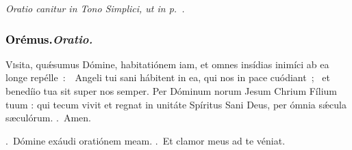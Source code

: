\documentclass[12pt]{article} %
\newenvironment{rubric}{\color{benred8} \itshape \leftskip 0in \setlength{\parindent}{0.25in}}{\vspace{2 mm}}
\newenvironment{response}{\leftskip 0in \setlength{\parindent}{0in}}{\vspace{2 mm}}
\let\oldgresixstar\gresixstar
\renewcommand{\gresixstar}{\textcolor{benred8}{\oldgresixstar}}
\let\oldgredagger\gredagger
\renewcommand{\gredagger}{\textcolor{benred8}{\oldgredagger}}
\let\oldVbar\Vbar
\renewcommand{\Vbar}{\textcolor{benred8}{\oldVbar .}}
\let\oldRbar\Rbar
\renewcommand{\Rbar}{\textcolor{benred8}{\oldRbar .}}
\def\capitulumSpace{\hspace{20 mm}}
\begin{document}
\gresetfirstlineaboveinitial{\small \textsc{ \textbf{\textcolor{benred8}{\Vbar}}}}{\small \textsc{ \textbf{\textcolor{benred8}{\Vbar}}}}


\begin{rubric}
Oratio canitur in Tono Simplici, ut in p.~\pageref{OratioSimplex}.

\end{rubric}

\subsubsection*{\textcolor{black}{Or\'{e}mus.}\capitulumSpace \emph{Oratio.}}

\begin{response}\lettrine{V}{i}sita, qu\'{\ae}sumus D\'{o}mine, habitati\'{o}nem iam, et omnes ins\'{i}dias inim\'{i}ci ab ea longe rep\'{e}lle~:~\gredagger\ Angeli tui sani h\'{a}bitent in ea, qui nos in pace cu\'{o}diant~; \gresixstar\ et bened\'{i}io tua sit super nos semper. Per D\'{o}minum norum Jesum Chrium F\'{i}lium tuum : qui tecum vivit et regnat in unit\'{a}te Sp\'{i}ritus Sani Deus, per \'{o}mnia s\'{\ae}cula s\ae cul\'{o}rum. \Rbar\ Amen.

\end{response}

\begin{response}
\Vbar\ Dómine exáudi oratiónem meam. \Rbar\ Et clamor meus ad te véniat.

\end{response}

\vspace{1.5mm}

\gresetfirstlineaboveinitial{\small \textsc{ \textbf{\textcolor{benred8}{II}}}}{\small \textsc{ \textbf{\textcolor{benred8}{II}}}}

%
%
%
%
%
\end{document}

